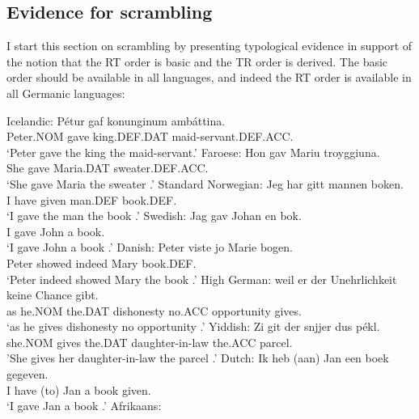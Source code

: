 	\subsection{Evidence for scrambling}
	I start this section on scrambling by presenting typological evidence in support of the notion that the RT order is basic and the TR order is derived. The basic order should be available in all languages, and indeed the RT order is available in all Germanic languages:
	\begin{exe}
\ex
\begin{xlist}
	\ex Icelandic: \label{ex:ice-rt}
\gll P\'{e}tur gaf konunginum amb\'{a}ttina.\\
Peter.NOM gave king.DEF.DAT maid-servant.DEF.ACC.\\
\trans `Peter gave the king the maid-servant.'
\ex Faroese:\label{ex:far-rt}
\gll Hon gav Mariu troyggiuna.\\
She gave Maria.DAT sweater.DEF.ACC.\\
\trans `She gave Maria the sweater \citep{Lundquist.2013b}.'
\ex Standard Norwegian: \label{ex:nor-rt}
\gll Jeg har gitt mannen boken.\\
I have given man.DEF book.DEF.\\
\trans `I gave the man the book \citep[ex 10]{Sprouse.1995}.'
\ex Swedish:\label{ex:sw-rt}
\gll Jag gav Johan en bok.\\
I gave John a book.\\
\trans `I gave John a book \citep{Holmberg.1995}.'
\ex Danish:\label{ex:dan-rt}
\gll Peter viste jo Marie bogen.\\
Peter showed indeed Mary book.DEF.\\
\trans `Peter indeed showed Mary the book \citep{Vikner.1989}.'
\ex High German:\label{ex:hg-rt}
\gll weil er der Unehrlichkeit keine Chance gibt.\\
as he.NOM the.DAT dishonesty no.ACC opportunity gives.\\
\trans `as he gives dishonesty no opportunity \citep[162]{Draye.1996}.'
\ex Yiddish:\label{ex:yid-rt}
\gll Zi git der snjjer dus pékl. \\
she.NOM gives the.DAT daughter-in-law the.ACC parcel.\\
\trans 'She gives her daughter-in-law the parcel \citep[ex 190a]{Birnbaum.1979}.'
\ex Dutch:\label{ex:dut-rt}
\gll Ik heb (aan) Jan een boek gegeven.\\
I have (to) Jan a book given.\\
\trans `I gave Jan a book \citep{Tiersma.1985}.'
\ex Afrikaans:\label{ex:af-rt}

\end{xlist}
\end{exe}
